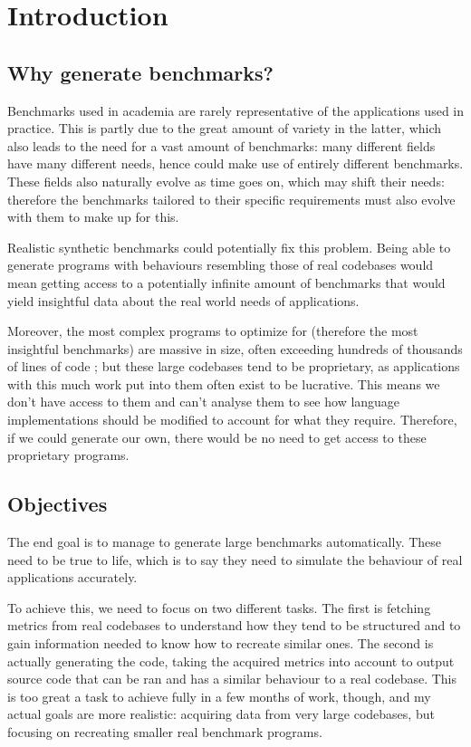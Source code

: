 \documentclass[12pt]{article}
\begin{document}
\newpage
\tableofcontents
\newpage

\section{Introduction}
\subsection{Why generate benchmarks?}
Benchmarks used in academia are rarely representative of the applications used in practice. This is partly due to the great amount of variety in the latter, which also leads to the need for a vast amount of benchmarks: many different fields have many different needs, hence could make use of entirely different benchmarks. These fields also naturally evolve as time goes on, which may shift their needs: therefore the benchmarks tailored to their specific requirements must also evolve with them to make up for this.

Realistic synthetic benchmarks could potentially fix this problem. Being able to generate programs with behaviours resembling those of real codebases would mean getting access to a potentially infinite amount of benchmarks that would yield insightful data about the real world needs of applications. 

Moreover, the most complex programs to optimize for (therefore the most insightful benchmarks) are massive in size, often exceeding hundreds of thousands of lines of code ; but these large codebases tend to be proprietary, as applications with this much work put into them often exist to be lucrative. This means we don't have access to them and can't analyse them to see how language implementations should be modified to account for what they require. Therefore, if we could generate our own, there would be no need to get access to these proprietary programs.

\subsection{Objectives}
\label{section:objectives}

The end goal is to manage to generate large benchmarks automatically. These need to be true to life, which is to say they need to simulate the behaviour of real applications accurately.

To achieve this, we need to focus on two different tasks. The first is fetching metrics from real codebases to understand how they tend to be structured and to gain information needed to know how to recreate similar ones. The second is actually generating the code, taking the acquired metrics into account to output source code that can be ran and has a similar behaviour to a real codebase. This is too great a task to achieve fully in a few months of work, though, and my actual goals are more realistic: acquiring data from very large codebases, but focusing on recreating smaller real benchmark programs. 
\end{document}
